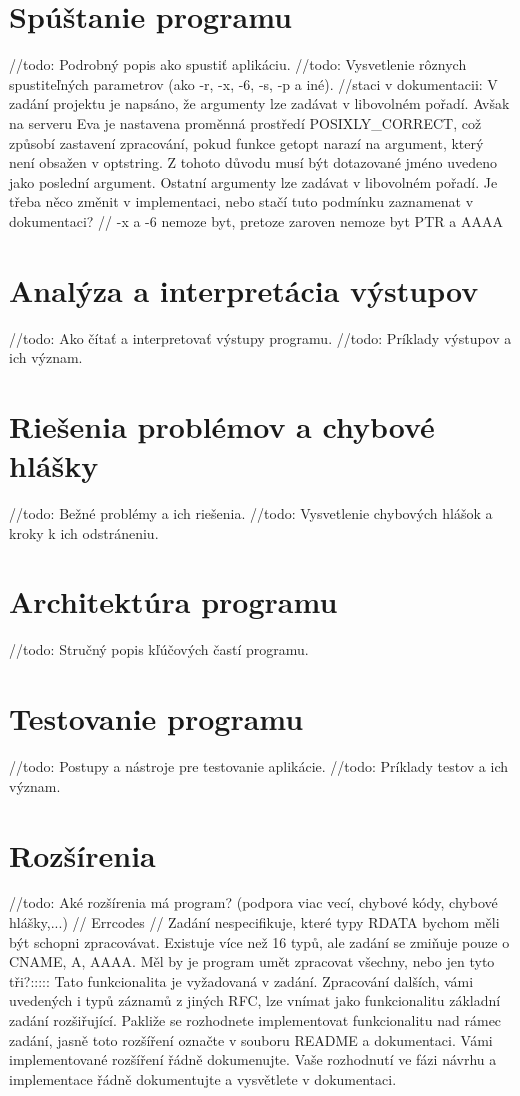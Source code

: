 \documentclass[a4paper, 11pt]{article}
\begin{document}
	\section{Spúštanie programu}
	//todo: Podrobný popis ako spustiť aplikáciu.
	//todo: Vysvetlenie rôznych spustiteľných parametrov (ako -r, -x, -6, -s, -p a iné).
	//staci v dokumentacii: V zadání projektu je napsáno, že argumenty lze zadávat v libovolném pořadí. Avšak na serveru Eva je nastavena proměnná prostředí POSIXLY_CORRECT, což způsobí zastavení zpracování, pokud funkce getopt narazí na argument, který není obsažen v optstring. Z tohoto důvodu musí být dotazované jméno uvedeno jako poslední argument. Ostatní argumenty lze zadávat v libovolném pořadí. Je třeba něco změnit v implementaci, nebo stačí tuto podmínku zaznamenat v dokumentaci?
	// -x a -6 nemoze byt, pretoze zaroven nemoze byt PTR a AAAA

	\section{Analýza a interpretácia výstupov}
	//todo: Ako čítať a interpretovať výstupy programu.
	//todo: Príklady výstupov a ich význam.

	\section{Riešenia problémov a chybové hlášky}
	//todo: Bežné problémy a ich riešenia.
	//todo: Vysvetlenie chybových hlášok a kroky k ich odstráneniu.
	
	\section{Architektúra programu}
	//todo: Stručný popis kľúčových častí programu.

	\section{Testovanie programu}
	//todo: Postupy a nástroje pre testovanie aplikácie.
	//todo: Príklady testov a ich význam.

	\section{Rozšírenia}
	//todo: Aké rozšírenia má program? (podpora viac vecí, chybové kódy, chybové hlášky,...)
	// Errcodes
	// Zadání nespecifikuje, které typy RDATA bychom měli být schopni zpracovávat. Existuje více než 16 typů, ale zadání se zmiňuje pouze o CNAME, A, AAAA. Měl by je program umět zpracovat všechny, nebo jen tyto tři?:::::	Tato funkcionalita je vyžadovaná v zadání. Zpracování dalších, vámi uvedených i typů záznamů z jiných RFC, lze vnímat jako funkcionalitu základní zadání rozšiřující. Pakliže se rozhodnete implementovat funkcionalitu nad rámec zadání, jasně toto rozšíření označte v souboru README a dokumentaci. Vámi implementované rozšíření řádně dokumenujte. Vaše rozhodnutí ve fázi návrhu a implementace řádně dokumentujte a vysvětlete v dokumentaci.
\end{document}
